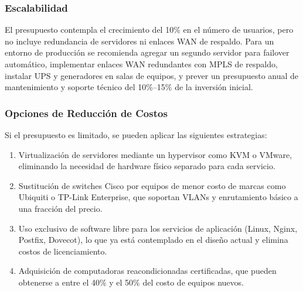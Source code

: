 \subsubsection{Escalabilidad}

El presupuesto contempla el crecimiento del 10\% en el número de usuarios,
pero no incluye redundancia de servidores ni enlaces WAN de respaldo. Para
un entorno de producción se recomienda agregar un segundo servidor para
failover automático, implementar enlaces WAN redundantes con MPLS de respaldo,
instalar UPS y generadores en salas de equipos, y prever un presupuesto anual
de mantenimiento y soporte técnico del 10\%--15\% de la inversión inicial.

\subsubsection{Opciones de Reducción de Costos}

Si el presupuesto es limitado, se pueden aplicar las siguientes estrategias:

\begin{enumerate}
\item Virtualización de servidores mediante un hypervisor como KVM o VMware,
eliminando la necesidad de hardware físico separado para cada servicio.
\item Sustitución de switches Cisco por equipos de menor costo de marcas como
Ubiquiti o TP-Link Enterprise, que soportan VLANs y enrutamiento básico a una
fracción del precio.
\item Uso exclusivo de software libre para los servicios de aplicación (Linux,
Nginx, Postfix, Dovecot), lo que ya está contemplado en el diseño actual y
elimina costos de licenciamiento.
\item Adquisición de computadoras reacondicionadas certificadas, que pueden
obtenerse a entre el 40\% y el 50\% del costo de equipos nuevos.
\end{enumerate}

